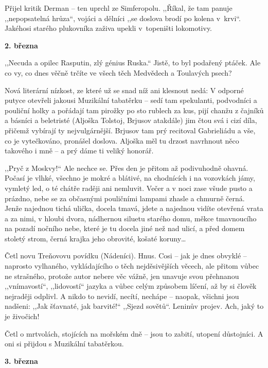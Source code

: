 Přijel kritik Derman -- ten uprchl ze Simferopolu. ,,Říkal, že tam panuje ,,nepopsatelná hrůza``, vojáci a dělníci ,,se doslova brodí po kolena v krvi``. Jakéhosi starého plukovníka zaživa upekli v topeništi lokomotivy.

\medskip

\noindent
\textbf{2. března}  

\noindent
,,Necuda a opilec Rasputin, zlý génius Ruska.`` Jistě, to byl podařený ptáček. Ale co vy, co dnes věčně trčíte ve všech těch Medvědech a Toulavých psech?

Nová literární nízkost, ze které už se snad níž ani klesnout nedá: V odporné putyce otevřeli jakousi Muzikální tabatěrku -- sedí tam spekulanti, podvodníci a pouliční holky a pořádají tam pirožky po sto rublech za kus, pijí chanžu z čajníků a básníci a beletristé (Aljoška Tolstoj, Brjusov atakdále) jim čtou svá i cizí díla, přičemž vybírají ty nejvulgárnější. Brjusov tam prý recitoval Gabrieliádu a vše, co je vytečkováno, pronášel doslova. Aljoška měl tu drzost navrhnout něco takového i mně -- a prý dáme ti veliký honorář.

,,Pryč z Moskvy!`` Ale nechce se. Přes den je přitom až podivuhodně ohavná. Počasí je vlhké, všechno je mokré a blátivé, na chodnících i na vozovkách jámy, vymletý led, o té chátře raději ani nemluvit. Večer a v noci zase všude pusto a prázdno, nebe se za občasnými pouličními lampami zhasle a chmurně černá. Jenže najednou tichá ulička, docela tmavá, jdete a najednou vidíte otevřená vrata a za nimi, v hloubi dvora, nádhernou siluetu starého domu, měkce tmavnoucího na pozadí nočního nebe, které je tu docela jiné než nad ulicí, a před domem stoletý strom, černá krajka jeho obrovité, košaté koruny\ldots

Četl novu Treňovovu povídku (Nádeníci). Hnus. Cosi -- jak je dnes obvyklé -- naprosto vylhaného, vykládajícího o těch nejděsivějších věcech, ale přitom vůbec ne strašného, protože autor nebere věc vážně, jen unavuje svou přehnanou ,,vnímavostí``, ,,lidovostí`` jazyka a vůbec celým způsobem líčení, až by si člověk nejraději odplivl. A nikdo to nevidí, necítí, nechápe -- naopak, všichni jsou nadšeni: ,,Jak šťavnaté, jak barvité!``
 ,,Sjezd sovětů``. Leninův projev. Ach, jaký to je živočich!

Četl o mrtvolách, stojících na mořském dně -- jsou to zabití, utopení důstojníci. A oni si přijdou s Muzikální tabatěrkou.

\pagebreak

\noindent
 \textbf{3. března}  

